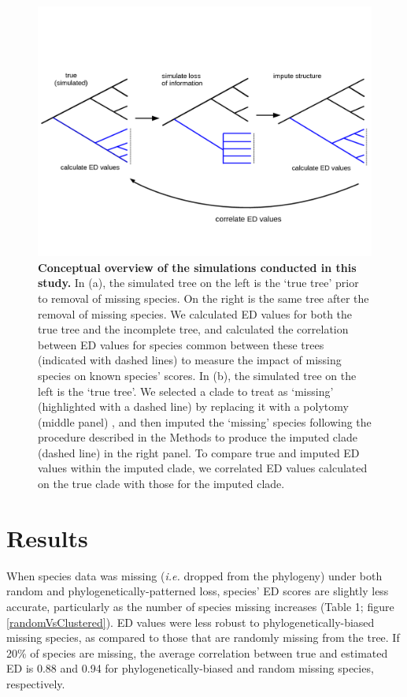 \documentclass[12pt,english]{article}
\begin{document}
\begin{figure}[!ht]
  \center
  \includegraphics[width=.75\textwidth]{imputeConcept.png}
  \caption{\textbf{Conceptual overview of the simulations conducted in this
  study.} In (a), the simulated tree on the left is the ‘true tree’ prior to
  removal of missing species. On the right is the same tree after the removal of
  missing species. We calculated ED values for both the true tree and the
  incomplete tree, and calculated the correlation between ED values for species
  common between these trees (indicated with dashed lines) to measure the impact
  of missing species on known species’ scores. In (b), the simulated tree on the
  left is the ‘true tree’. We selected a clade to treat as ‘missing’
  (highlighted with a dashed line) by replacing it with a polytomy (middle
  panel) , and then imputed the ‘missing’ species following the procedure
  described in the Methods to produce the imputed clade (dashed line) in the
  right panel. To compare true and imputed ED values within the imputed clade,
  we correlated ED values calculated on the true clade with those for the
  imputed clade. }
  \label{imputeConcept}
\end{figure}

\section*{Results}
When species data was missing (\emph{i.e.} dropped from the phylogeny) under
both random and phylogenetically-patterned loss, species’ ED scores are slightly
less accurate, particularly as the number of species missing increases (Table 1;
figure \ref{randomVsClustered}). ED values were less robust to
phylogenetically-biased missing species, as compared to those that are randomly
missing from the tree. If 20\% of species are missing, the average correlation
between true and estimated ED is 0.88 and 0.94 for phylogenetically-biased and
random missing species, respectively.
\end{document}
